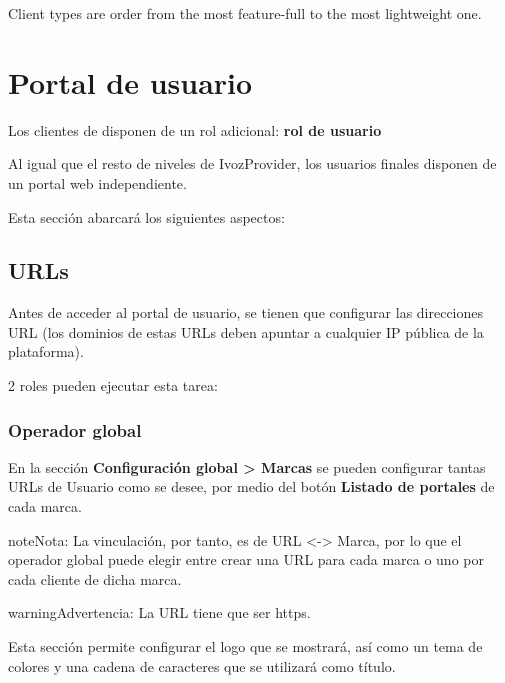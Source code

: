 \documentclass[letterpaper,10pt,spanish]{sphinxmanual}
\begin{document}
Client types are order from the most feature-full to the most lightweight one.


\chapter{Portal de usuario}
\label{user_portal/index:userportal}\label{user_portal/index:user-portal}\label{user_portal/index::doc}
Los clientes de {\hyperref[administration_portal/brand/clients/virtual_pbx:virtual\string-pbx]{}} disponen de un rol adicional: \textbf{rol de usuario}

Al igual que el resto de niveles de IvozProvider, los usuarios finales disponen de un portal web independiente.

Esta sección abarcará los siguientes aspectos:


\section{URLs}
\label{user_portal/urls::doc}\label{user_portal/urls:urls}
Antes de acceder al portal de usuario, se tienen que configurar las direcciones URL (los dominios de estas URLs deben apuntar a cualquier IP pública de la plataforma).

2 roles pueden ejecutar esta tarea:


\subsection{Operador global}
\label{user_portal/urls:god-operator}
En la sección \textbf{Configuración global \textgreater{} Marcas} se pueden configurar tantas URLs de Usuario como se desee, por medio del botón \textbf{Listado de portales} de cada marca.

\begin{notice}{note}{Nota:}
La vinculación, por tanto, es de URL \textless{}-\textgreater{} Marca, por lo que el operador global puede elegir entre crear una URL para cada marca o uno por cada cliente de dicha marca.
\end{notice}

\begin{notice}{warning}{Advertencia:}
La URL tiene que ser https.
\end{notice}

Esta sección permite configurar el logo que se mostrará, así como un tema de colores y una cadena de caracteres que se utilizará como título.
\end{document}

